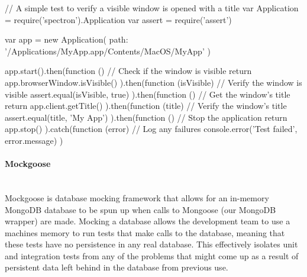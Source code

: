 \begin{javascriptcode}
// A simple test to verify a visible window is opened with a title
var Application = require('spectron').Application
var assert = require('assert')

var app = new Application({
  path: '/Applications/MyApp.app/Contents/MacOS/MyApp'
})

app.start().then(function () {
  // Check if the window is visible
  return app.browserWindow.isVisible()
}).then(function (isVisible) {
  // Verify the window is visible
  assert.equal(isVisible, true)
}).then(function () {
  // Get the window's title
  return app.client.getTitle()
}).then(function (title) {
  // Verify the window's title
  assert.equal(title, 'My App')
}).then(function () {
  // Stop the application
  return app.stop()
}).catch(function (error) {
  // Log any failures
  console.error('Test failed', error.message)
})
\end{javascriptcode}

\paragraph{Mockgoose} \mbox{}\\[\paragraphheaderspace]
Mockgoose is database mocking framework that allows for an in-memory MongoDB database to be spun up when calls to Mongoose (our MongoDB wrapper) are made. Mocking a database allows the development team to use a machine\textquotesingle s memory to run tests that make calls to the database, meaning that these tests have no persistence in any real database. This effectively isolates unit and integration tests from any of the problems that might come up as a result of persistent data left behind in the database from previous use.
